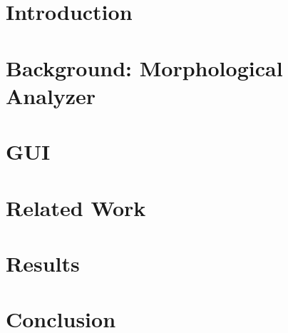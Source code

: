 

\section{Introduction}
\label{sec:introduction}


%

\section{Background: Morphological Analyzer}
\label{sec:morph}


\section{\framework}
\label{sec:framework}


\section{\framework GUI}
\label{sec:gui}



\section{Related Work}
\label{sec:related}


\section{Results}
\label{sec:results}


\section{Conclusion}
\label{sec:conclusion}



{\tiny }


